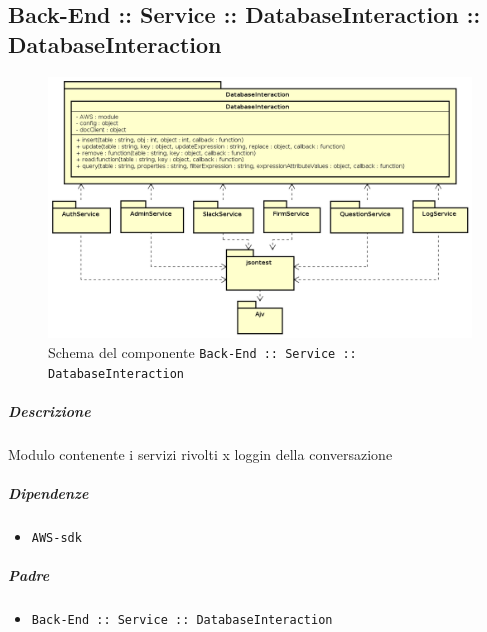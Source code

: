\documentclass[../ManualeSviluppatore_v2.0.0.tex]{subfiles}
\begin{document}
\subsection{Back-End :: Service :: DatabaseInteraction :: DatabaseInteraction}
\begin{figure}[!h]
	\centering
	\includegraphics[scale=0.5]{Architettura/Back-End/Service/DatabaseInteraction.png}
	\caption{Schema del componente \texttt{Back-End :: Service :: DatabaseInteraction}}
\end{figure}
\subparagraph{Descrizione} Modulo contenente i servizi rivolti x loggin della conversazione
\subparagraph{Dipendenze}
\begin{itemize}
	\item \texttt{AWS-sdk}
\end{itemize}
\subparagraph{Padre}
\begin{itemize}
	\item \texttt{Back-End :: Service :: DatabaseInteraction}
\end{itemize}
\end{document}
